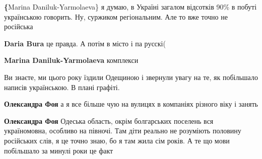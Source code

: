 \begin{itemize}
\begin{itemize}
\textbf\{Marina Daniluk-Yarmolaeva\} я думаю, в Україні загалом відсотків 90\% в
побуті українською говорить. Ну, суржиком регіональним. Але то вже точно не
російська

 

\textbf{Daria Bura} це правда. А потім в місто і па русскі(

 
\textbf{Marina Daniluk-Yarmolaeva} комплекси
\end{itemize}

 
Ви знаєте, ми цього року їздили Одещиною і звернули увагу на те, як побільшало
написів українською. В плані графіті.

\begin{itemize}
 

\textbf{Олександра Фоя} а я все більше чую на вулицях в компаніях різного віку і занять

 
\textbf{Олександра Фоя} Одеська область, окрім болгарських поселень вся україномовна, особливо на півночі. Там діти реально не розуміють половину російських слів, я це точно знаю, бо я там жила сім років. А те що мови побільшало за минулі роки це факт


\end{itemize}
\end{itemize}
